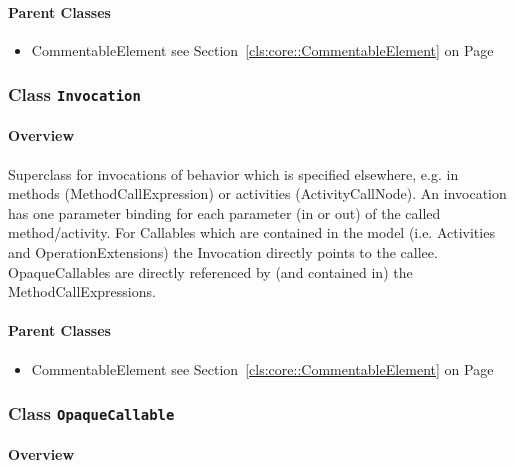 \paragraph{Parent Classes}
\begin{itemize}
\item CommentableElement see Section~\ref{cls:core::CommentableElement} on Page~\pageref{cls:core::CommentableElement}\end{itemize}
\subsubsection{\Large{Class \bfseries \texttt{Invocation}\normalfont}}
\label{cls:storydiagrams::calls::Invocation} 
\paragraph{Overview}

	
			
Superclass for invocations of behavior which is specified elsewhere, e.g. in methods (MethodCallExpression) or activities (ActivityCallNode). An invocation has one parameter binding for each parameter (in or out) of the called method/activity. For Callables which are contained in the model (i.e. Activities and OperationExtensions) the Invocation directly points to the callee. OpaqueCallables are directly referenced by (and contained in) the MethodCallExpressions.	
		
	



\paragraph{Parent Classes}
\begin{itemize}
\item CommentableElement see Section~\ref{cls:core::CommentableElement} on Page~\pageref{cls:core::CommentableElement}\end{itemize}
\subsubsection{\Large{Class \bfseries \texttt{OpaqueCallable}\normalfont}}
\label{cls:storydiagrams::calls::OpaqueCallable} 
\paragraph{Overview}

	
			
